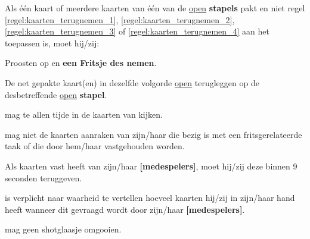 \vervolgLijst{}
    \item Als \eenSpeler één kaart of meerdere kaarten van één van de \ul{open} \textbf{stapels} pakt en niet regel \ref{regel:kaarten_terugnemen_1}, \ref{regel:kaarten_terugnemen_2}, \ref{regel:kaarten_terugnemen_3} of \ref{regel:kaarten_terugnemen_4} aan het toepassen is, moet hij/zij:
    \puntLijst{}
       \item Proosten op  en \textbf{een Fritsje des nemen}\footnotemark[3].
        \item De net gepakte kaart(en) in dezelfde volgorde \ul{open} terugleggen op de desbetreffende \ul{open} \textbf{stapel}.
    \eindPuntLijst{}
\eindLijst{}  


\vervolgLijst{}
    \item \EenSpeler mag te allen tijde in de kaarten van \alleSpelers kijken.
\eindLijst{}

\vervolgLijst{}
    \item \EenSpeler mag niet de kaarten aanraken van zijn/haar \medeSpelers die bezig is met een fritsgerelateerde taak of die door hem/haar vastgehouden worden.
\eindLijst{}  

\vervolgLijst{}
    \item Als \eenSpeler kaarten vast heeft van zijn/haar \textbf{[medespelers]}, moet hij/zij deze binnen 9 seconden teruggeven.
\eindLijst{}

\vervolgLijst{}
    \item \EenSpeler is verplicht naar waarheid te vertellen hoeveel kaarten hij/zij in zijn/haar hand heeft wanneer dit gevraagd wordt door zijn/haar \textbf{[medespelers]}.
\eindLijst{}   


\newpage
{}
\label{sec:algemeen_einde}



\vervolgLijst{}
    \item \EenSpeler mag geen shotglaasje omgooien.
\eindLijst{} 

